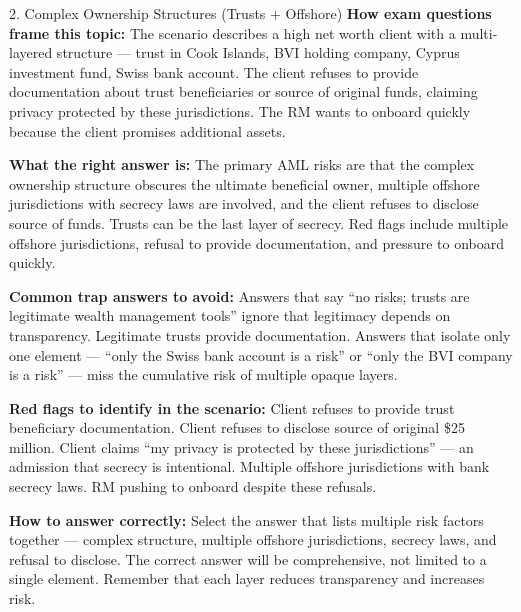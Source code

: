 \documentclass[11pt,a4paper]{beamer}
\begin{document}
	\begin{frame}{2. Complex Ownership Structures (Trusts + Offshore)}
		\tiny
		\noindent\textbf{How exam questions frame this topic:} The scenario describes a high net worth client with a multi-layered structure — trust in Cook Islands, BVI holding company, Cyprus investment fund, Swiss bank account. The client refuses to provide documentation about trust beneficiaries or source of original funds, claiming privacy protected by these jurisdictions. The RM wants to onboard quickly because the client promises additional assets.
		
		\vspace{0.1cm}
		\noindent\textbf{What the right answer is:} The primary AML risks are that the complex ownership structure obscures the ultimate beneficial owner, multiple offshore jurisdictions with secrecy laws are involved, and the client refuses to disclose source of funds. Trusts can be the last layer of secrecy. Red flags include multiple offshore jurisdictions, refusal to provide documentation, and pressure to onboard quickly.
		
		\vspace{0.1cm}
		\noindent\textbf{Common trap answers to avoid:} Answers that say “no risks; trusts are legitimate wealth management tools” ignore that legitimacy depends on transparency. Legitimate trusts provide documentation. Answers that isolate only one element — “only the Swiss bank account is a risk” or “only the BVI company is a risk” — miss the cumulative risk of multiple opaque layers.
		
		\vspace{0.1cm}
		\noindent\textbf{Red flags to identify in the scenario:} Client refuses to provide trust beneficiary documentation. Client refuses to disclose source of original \$25 million. Client claims “my privacy is protected by these jurisdictions” — an admission that secrecy is intentional. Multiple offshore jurisdictions with bank secrecy laws. RM pushing to onboard despite these refusals.
		
		\vspace{0.1cm}
		\noindent\textbf{How to answer correctly:} Select the answer that lists multiple risk factors together — complex structure, multiple offshore jurisdictions, secrecy laws, and refusal to disclose. The correct answer will be comprehensive, not limited to a single element. Remember that each layer reduces transparency and increases risk.
	\end{frame}
	
\end{document}
